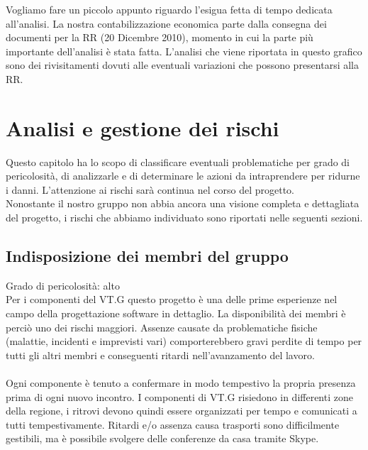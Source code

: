 \vspace{0.8cm}
 
Vogliamo fare un piccolo appunto riguardo l'esigua fetta di tempo dedicata
all'analisi. La nostra contabilizzazione economica parte dalla consegna dei documenti per 
la RR (20 Dicembre 2010), momento in cui la parte pi\`u importante dell'analisi \`e stata fatta.
L'analisi che viene riportata in questo grafico sono dei rivisitamenti dovuti
alle eventuali variazioni che possono presentarsi alla RR.\\ 

\chapter{Analisi e gestione dei rischi}
\thispagestyle{fancy}

Questo capitolo ha lo scopo di classificare eventuali problematiche per grado
di pericolosit\`a, di analizzarle e di determinare le azioni da intraprendere per
ridurne i danni. L'attenzione ai rischi sar\`a continua nel corso del
progetto.\\ 
Nonostante il nostro gruppo non abbia ancora una visione completa e dettagliata del 
progetto, i rischi che abbiamo individuato sono riportati nelle seguenti sezioni.

\section{Indisposizione dei membri del gruppo}
Grado di pericolosit\`a: alto\\
Per i componenti del VT.G questo progetto \`e una delle prime esperienze nel campo della progettazione software in dettaglio. 
La disponibilit\`a dei membri \`e perci\`o uno dei rischi maggiori. 
Assenze causate da problematiche fisiche (malattie, incidenti e imprevisti vari) comporterebbero gravi perdite 
di tempo per tutti gli altri membri e conseguenti ritardi nell'avanzamento del
lavoro.\\
\\
Ogni componente \`e tenuto a confermare in modo tempestivo la propria presenza prima di ogni nuovo incontro.
I componenti di VT.G risiedono in differenti zone della regione, i ritrovi devono quindi essere organizzati 
per tempo e comunicati a tutti tempestivamente. Ritardi e/o assenza causa trasporti sono difficilmente gestibili, ma \`e possibile svolgere delle conferenze da casa tramite Skype.

